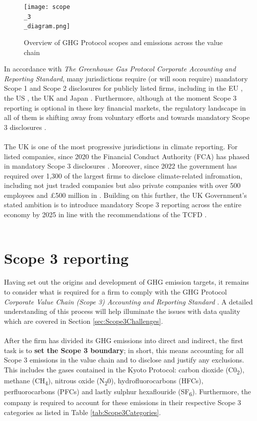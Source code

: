 \documentclass[12pt,twoside]{report}
\newcommand\fnote[1]{\captionsetup{font=scriptsize, justification=raggedright, singlelinecheck=false}\subcaption*{\textit{#1}}}
\begin{document}
\begin{figure}[H]
	\centering
	\caption{Overview of GHG Protocol scopes and emissions across the value chain}
	\label{fig:Scope3Diagram}
	\texttt{[image: scope\\\_3\\\_diagram.png]}
	\fnote{Source: \cite{ghgscope32013}, p.6}
\end{figure}

In accordance with \textit{The Greenhouse Gas Protocol Corporate Accounting and Reporting Standard}, many jurisdictions require (or will soon require) mandatory Scope 1 and Scope 2 disclosures for publicly listed firms, including in the EU \cite{eu20232772}, the US \cite{sec2024}, the UK \cite{ukleg2018} and Japan \cite{fsa2022}. Furthermore, although at the moment Scope 3 reporting is optional in these key financial markets, the regulatory landscape in all of them is shifting away from voluntary efforts and towards mandatory Scope 3 disclosures \cite{ftserussell2024}. 
\\ \\
The UK is one of the most progressive jurisdictions in climate reporting. For listed companies, since 2020 the Financial Conduct Authority (FCA) has phased in mandatory Scope 3 disclosures \cite{fca2020, fca2021}. Moreover, since 2022 the government has required over 1,300 of the largest firms to disclose climate-related infromation, including not just traded companies but also private companies with over 500 employees and £500 million in  \cite{UK2021}. Building on this further, the UK Government's stated ambition is to introduce mandatory Scope 3 reporting across the entire economy by 2025 in line with the recommendations of the TCFD \cite{ukgov2020}. 
\\ \\
\section{Scope 3 reporting} \label{sec:Scope3Reporting}
Having set out the origins and development of GHG emission targets, it remains to consider what is required for a firm to comply with the GHG Protocol \textit{Corporate Value Chain (Scope 3) Accounting and Reporting Standard} \cite{ghgscope32013}. A detailed understanding of this process will help illuminate the issues with data quality which are covered in Section \ref{sec:Scope3Challenges}.
\\ \\
After the firm has divided its GHG emissions into direct and indirect, the first task is to \textbf{set the Scope 3 boundary}; in short, this means accounting for all Scope 3 emissions in the value chain and to disclose and justify any exclusions. This includes the gases contained in the Kyoto Protocol: carbon dioxide (C0\textsubscript{2}), methane (CH\textsubscript{4}), nitrous oxide (N\textsubscript{2}0), hydrofluorocarbons (HFCs), perfluorocarbons (PFCs) and lastly sulphur hexaflouride (SF\textsubscript{6}). Furthermore, the company is required to account for these emissions in their respective Scope 3 categories as listed in Table \ref{tab:Scope3Categories}. 
\end{document}
